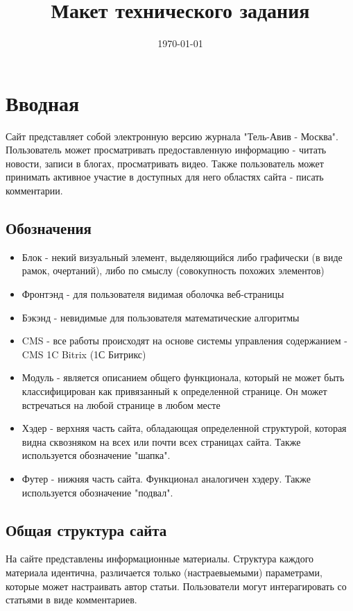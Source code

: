 \documentclass[DIV=calc, paper=a4, fontsize=11pt]{scrartcl} %
\title{Макет технического задания} %
\date{\today} %
\begin{document}
\maketitle

\section{Вводная}
Сайт представляет собой электронную версию журнала "Тель-Авив - Москва". Пользователь может просматривать предоставленную информацию - читать новости, записи в блогах, просматривать видео. Также пользователь может принимать активное участие в доступных для него областях сайта - писать комментарии.

\subsection{Обозначения}

\begin{itemize}
\item Блок - некий визуальный элемент, выделяющийся либо графически (в виде рамок, очертаний), либо по смыслу (совокупность похожих элементов)
\item Фронтэнд - для пользователя видимая оболочка веб-страницы
\item Бэкэнд - невидимые для пользователя математические алгоритмы
\item CMS - все работы происходят на основе системы управления содержанием - CMS 1C Bitrix (1С Битрикс)
\item Модуль - является описанием общего функционала, который не может быть классифицирован как привязанный к определенной странице. Он может встречаться на любой странице в любом месте
\item Хэдер - верхняя часть сайта, обладающая определенной структурой, которая видна сквозняком на всех или почти всех страницах сайта. Также используется обозначение "шапка".
\item Футер - нижняя часть сайта. Функционал аналогичен хэдеру. Также используется обозначение "подвал".
\end{itemize}

\subsection{Общая структура сайта}

На сайте представлены информационные материалы. Структура каждого материала идентична, различается только (настраевыемыми) параметрами, которые может настраивать автор статьи. Пользователи могут интерагировать со статьями в виде комментариев.
\end{document}
